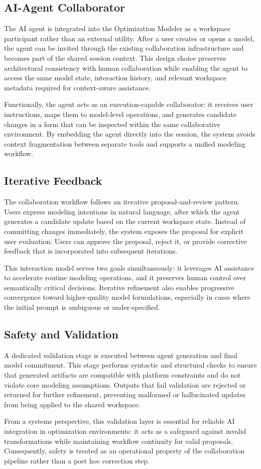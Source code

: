 \subsection{AI-Agent Collaborator}
The AI agent is integrated into the Optimization Modeler as a workspace participant rather than an external utility. After a user creates or opens a model, the agent can be invited through the existing collaboration infrastructure and becomes part of the shared session context. This design choice preserves architectural consistency with human collaboration while enabling the agent to access the same model state, interaction history, and relevant workspace metadata required for context-aware assistance.

Functionally, the agent acts as an execution-capable collaborator: it receives user instructions, maps them to model-level operations, and generates candidate changes in a form that can be inspected within the same collaborative environment. By embedding the agent directly into the session, the system avoids context fragmentation between separate tools and supports a unified modeling workflow.

\subsection{Iterative Feedback}
The collaboration workflow follows an iterative proposal-and-review pattern. Users express modeling intentions in natural language, after which the agent generates a candidate update based on the current workspace state. Instead of committing changes immediately, the system exposes the proposal for explicit user evaluation. Users can approve the proposal, reject it, or provide corrective feedback that is incorporated into subsequent iterations.

This interaction model serves two goals simultaneously: it leverages AI assistance to accelerate routine modeling operations, and it preserves human control over semantically critical decisions. Iterative refinement also enables progressive convergence toward higher-quality model formulations, especially in cases where the initial prompt is ambiguous or under-specified.

\subsection{Safety and Validation}
A dedicated validation stage is executed between agent generation and final model commitment. This stage performs syntactic and structural checks to ensure that generated artifacts are compatible with platform constraints and do not violate core modeling assumptions. Outputs that fail validation are rejected or returned for further refinement, preventing malformed or hallucinated updates from being applied to the shared workspace.

From a systems perspective, this validation layer is essential for reliable AI integration in optimization environments: it acts as a safeguard against invalid transformations while maintaining workflow continuity for valid proposals. Consequently, safety is treated as an operational property of the collaboration pipeline rather than a post hoc correction step.



